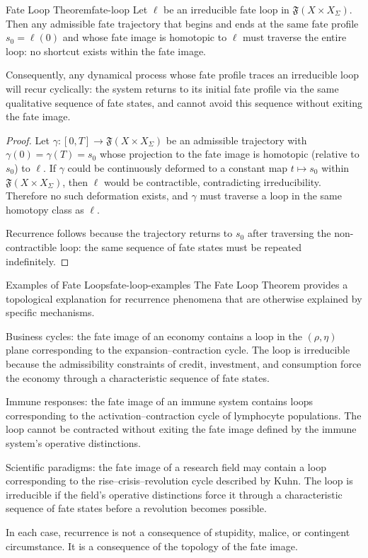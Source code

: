 \documentclass[12pt,twoside,openright]{book}
\newcommand{\distPairs}{X\times X}
\newcommand{\fateMap}{\mathfrak{F}}
\newcommand{\survRatio}{\rho}             %
\newcommand{\repEff}{\eta}               %
\providecommand{\fateTraj}{\gamma}
\providecommand{\fateImage}[1]{\fateMap(#1)}
\begin{document}
\begin{theorem}{Fate Loop Theorem}{fate-loop}
Let $\ell$ be an irreducible fate loop in
$\fateImage{\distPairs_\Sigma}$. Then any admissible fate
trajectory that begins and ends at the same fate profile
$s_0=\ell(0)$ and whose fate image is homotopic to $\ell$
must traverse the entire loop: no shortcut exists within the
fate image.

Consequently, any dynamical process whose fate profile traces
an irreducible loop will recur cyclically: the system returns
to its initial fate profile via the same qualitative sequence
of fate states, and cannot avoid this sequence without exiting
the fate image.
\begin{proof}
Let $\fateTraj:[0,T]\to\fateImage{\distPairs_\Sigma}$ be an
admissible trajectory with $\fateTraj(0)=\fateTraj(T)=s_0$
whose projection to the fate image is homotopic (relative to
$s_0$) to $\ell$. If $\fateTraj$ could be continuously
deformed to a constant map $t\mapsto s_0$ within
$\fateImage{\distPairs_\Sigma}$, then $\ell$ would be
contractible, contradicting irreducibility. Therefore no such
deformation exists, and $\fateTraj$ must traverse a loop in
the same homotopy class as $\ell$.

Recurrence follows because the trajectory returns to $s_0$
after traversing the non-contractible loop: the same sequence
of fate states must be repeated indefinitely.
\end{proof}
\end{theorem}

\begin{remark}{Examples of Fate Loops}{fate-loop-examples}
The Fate Loop Theorem provides a topological explanation for
recurrence phenomena that are otherwise explained by specific
mechanisms.

Business cycles: the fate image of an economy contains a loop
in the $(\survRatio, \repEff)$ plane corresponding to the
expansion--contraction cycle. The loop is irreducible because
the admissibility constraints of credit, investment, and
consumption force the economy through a characteristic
sequence of fate states.

Immune responses: the fate image of an immune system contains
loops corresponding to the activation--contraction cycle of
lymphocyte populations. The loop cannot be contracted without
exiting the fate image defined by the immune system's operative
distinctions.

Scientific paradigms: the fate image of a research field may
contain a loop corresponding to the rise--crisis--revolution
cycle described by Kuhn. The loop is irreducible if the field's
operative distinctions force it through a characteristic
sequence of fate states before a revolution becomes possible.

In each case, recurrence is not a consequence of stupidity,
malice, or contingent circumstance. It is a consequence of
the topology of the fate image.
\end{remark}
\end{document}
